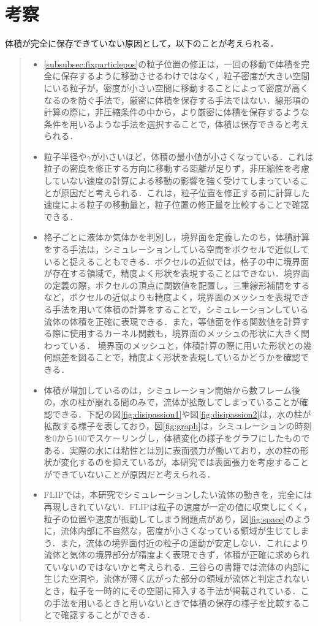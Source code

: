 \documentclass[a4j,12pt]{jreport}
\begin{document}
\section{考察} \label{sec:exp_consideration}
体積が完全に保存できていない原因として，以下のことが考えられる．
\begin{quote}
	\begin{itemize}
		\item \ref{subsubsec:fixparticlepos}の粒子位置の修正は，一回の移動で体積を完全に保存するように移動させるわけではなく，粒子密度が大きい空間にいる粒子が，密度が小さい空間に移動することによって密度が高くなるのを防ぐ手法で，厳密に体積を保存する手法ではない．線形項の計算の際に，非圧縮条件の中から，より厳密に体積を保存するような条件を用いるような手法を選択することで，体積は保存できると考えられる．
		\item 粒子半径や$\gamma$が小さいほど，体積の最小値が小さくなっている．これは粒子の密度を修正する方向に移動する距離が足りず，非圧縮性を考慮していない速度の計算による移動の影響を強く受けてしまっていることが原因だと考えられる．これは，粒子位置を修正する前に計算した速度による粒子の移動量と，粒子位置の修正量を比較することで確認できる．
		\item 格子ごとに液体か気体かを判別し，境界面を定義したのち，体積計算をする手法は，シミュレーションしている空間をボクセルで近似していると捉えることもできる．ボクセルの近似では，格子の中に境界面が存在する領域で，精度よく形状を表現することはできない．境界面の定義の際，ボクセルの頂点に関数値を配置し，三重線形補間をするなど，ボクセルの近似よりも精度よく，境界面のメッシュを表現できる手法を用いて体積の計算をすることで，シミュレーションしている流体の体積を正確に表現できる．また，等値面を作る関数値を計算する際に使用するカーネル関数も，境界面のメッシュの形状に大きく関わっている．
境界面のメッシュと，体積計算の際に用いた形状との幾何誤差を図ることで，精度よく形状を表現しているかどうかを確認できる．		\item 体積が増加しているのは，シミュレーション開始から数フレーム後の，水の柱が崩れる間のみで，流体が拡散してしまっていることが確認できる．下記の図\ref{fig:disipassion1}や図\ref{fig:disipassion2}は，水の柱が拡散する様子を表しており，図\ref{fig:graph}は，シミュレーションの時刻を0から100でスケーリングし，体積変化の様子をグラフにしたものである．実際の水には粘性とは別に表面張力が働いており，水の柱の形状が変化するのを抑えているが，本研究では表面張力を考慮することができていないことが原因だと考えられる．
		\item FLIPでは，本研究でシミュレーションしたい流体の動きを，完全には再現しきれていない．FLIPは粒子の速度が一定の値に収束しにくく，粒子の位置や速度が振動してしまう問題点があり，図\ref{fig:space}のように，流体内部に不自然な，密度が小さくなっている領域が生じてしまう．また，流体の境界面付近の粒子の運動が安定しない．これにより流体と気体の境界部分が精度よく表現できず，体積が正確に求められていないのではないかと考えられる．三谷らの書籍\cite{book}では流体の内部に生じた空洞や，流体が薄く広がった部分の領域が流体と判定されないとき，粒子を一時的にその空間に挿入する手法が掲載されている．この手法を用いるときと用いないときで体積の保存の様子を比較することで確認することができる．
	\end{itemize}
\end{quote}
\end{document}
